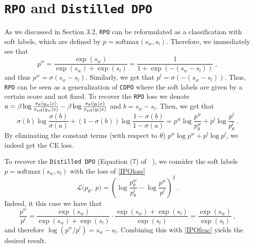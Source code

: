 \section{\texttt{RPO} and \texttt{Distilled DPO}} \label{Appendix:RPO}
    As we discussed in Section 3.2, \texttt{RPO} can be reformulated as a classification with soft labels, which are defined by $p = \text{softmax}(s_w, s_l)$. Therefore, we immediately see that
    \begin{equation*}
        p^{w} = \frac{\exp(s_{w})}{\exp(s_{w}) + \exp(s_{l})} = \frac{1}{1 + \exp(-(s_{w} - s_{l}))}\ ,
    \end{equation*}
    and thus $p^{w} = \sigma(s_{w} - s_{l})$. Similarly, we get that $p^{l} = \sigma(-(s_{w} - s_{l}))$. Thus, \texttt{RPO} can be seen as a generalization of \texttt{CDPO} where the soft labels are given by a certain score and not fixed. To recover the \texttt{RPO} loss we denote $a = \beta\log \frac{\pi_{\theta}(y_w|x)}{\pi_{\textrm{ref}}(y_w|x)} - \beta\log \frac{\pi_{\theta}(y_l|x)}{\pi_{\textrm{ref}}(y_l|x)}$ and $b = s_w - s_l$. Then, we get that
    \begin{equation*}
        \sigma(b) \log \frac{\sigma(b)}{\sigma(a)} + (1-\sigma(b)) \log\frac{1-\sigma(b)}{1-\sigma(a)} = p^{w}\log\frac{p^{w}}{p_{\theta}^{w}} + p^{l}\log\frac{p^{l}}{p_{\theta}^{l}}\ .
    \end{equation*}
    By eliminating the constant terms (with respect to $\theta$) $p^{w}\log p^{w} + p^{l}\log p^{l}$, we indeed get the CE loss.

    To recover the \texttt{Distilled DPO} (Equation (7) of ~\citet{distilled_DPO}), we consider the soft labels $p = \text{softmax}(s_w, s_l)$ with the loss of \eqref{IPOloss}
    \begin{equation*}
        \mathcal{L}\big(p_{\theta},\ p\big) = \left(\log\frac{p^{w}_{\theta}}{p^{l}_{\theta}} - \log\frac{p^{w}}{p^{l}}\right)^2\ .
    \end{equation*}
    Indeed, it this case we have that
    \begin{equation*}
        \frac{p^{w}}{p^{l}} = \frac{\exp(s_{w})}{\exp(s_{w}) + \exp(s_{l})} \cdot \frac{\exp(s_{w}) + \exp(s_{l})}{\exp(s_{l})} = \frac{\exp(s_{w})}{\exp(s_{l})}\ ,
    \end{equation*}
    and therefore $\log (p^{w}/p^{l}) = s_{w} - s_{l}$. Combining this with \eqref{IPOfrac} yields the desired result.

